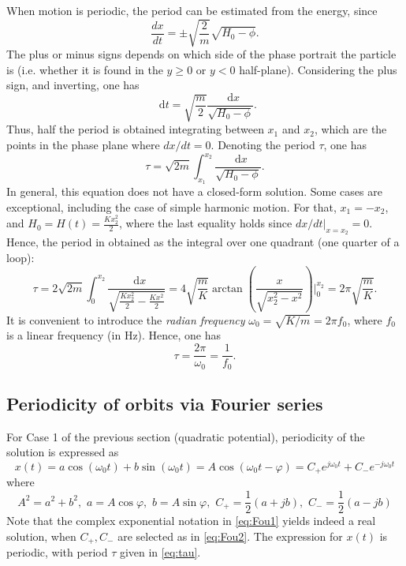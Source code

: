 \documentclass[11pt,twoside,a4paper,english]{book}
\newcommand{\dif}{\mathop{}\!\mathrm{d}}
\begin{document}
When motion is periodic, the period can be estimated from the energy, since
\begin{equation}\label{eq:dxdtEn}
    \frac{dx}{dt} = \pm\sqrt{\frac{2}{m}}\sqrt{H_0-\phi}.
\end{equation}
The plus or minus signs depends on which side of the phase portrait the particle is (i.e. whether it is found in the $y\geq0$ or $y<0$ half-plane). Considering the plus sign, and inverting, one has
\begin{equation}
    \dif t = \sqrt{\frac{m}{2}}\frac{\dif x}{\sqrt{H_0-\phi}}.
\end{equation}
Thus, half the period is obtained integrating between $x_1$ and $x_2$, which are the points in the phase plane where $dx/dt = 0$. Denoting the period $\tau$, one has
\begin{equation}
    \tau = \sqrt{2m} \int_{x_1}^{x_2}\frac{\dif x}{\sqrt{H_0-\phi}}.
\end{equation}
In general, this equation does not have a closed-form solution. Some cases are exceptional, including the case of simple harmonic motion. For that, $x_1 = -x_2$, and $H_0=H(t) =\frac{K x_2^2}{2}$, where the last equality holds since $dx/dt|_{x=x_2} = 0$. Hence, the period in obtained as the integral over one quadrant (one quarter of a loop):
\begin{equation}
    \tau = 2\sqrt{2m} \int_0^{x_2}\frac{\dif x}{\sqrt{\frac{K x_2^2}{2}-\frac{K x^2}{2}}} = 4 \sqrt{\frac{m}{K}} \arctan\left( \frac{x}{\sqrt{x_2^2-x^2}}\right)\big|_0^{x_2} = 2\pi \sqrt{\frac{m}{K}}.
\end{equation}
It is convenient to introduce the \emph{radian frequency} $\omega_0 = \sqrt{K/m} = 2\pi f_0$, where $f_0$ is a linear frequency (in Hz). Hence, one has
\begin{equation}\label{eq:tau}
    \tau = \frac{2\pi}{\omega_0} = \frac{1}{f_0}.
\end{equation} 

\subsection{Periodicity of orbits via Fourier series}

For Case 1 of the previous section (quadratic potential), periodicity of the solution is expressed as 
\begin{equation}\label{eq:Fou1}
    x(t) = a \cos(\omega_0 t) + b \sin(\omega_0 t) = A \cos(\omega_0 t - \varphi)  = C_+ e^{j\omega_0 t} + C_- e^{-j \omega_0 t}
\end{equation}
where
\begin{equation}\label{eq:Fou2}
    A^2 = a^2 + b^2, \,\, a = A \cos\varphi, \,\, b = A\sin\varphi, \,\, C_+ = \frac{1}{2}(a+jb), \,\, C_- = \frac{1}{2}(a-jb)
\end{equation}
Note that the complex exponential notation in \eqref{eq:Fou1} yields indeed a real solution, when $C_+,C_-$ are selected as in \eqref{eq:Fou2}. The expression for $x(t)$ is periodic, with period $\tau$ given in \eqref{eq:tau}. 
\end{document}
